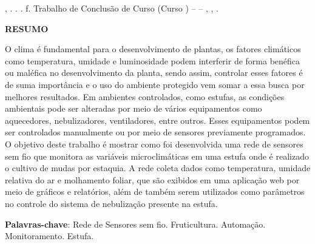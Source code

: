 %
%
\begin{RESUMO}

\thispagestyle{empty}
    \begin{SingleSpace}
	\noindent
		{\expandafter\uppercase\expandafter{\imprimirsobrenomeautor}}, {\imprimirnomeautor}. \textbf{{\imprimirtitulotb}}. {\imprimirdata}. \pageref{LastPage}f. Trabalho de Conclusão de Curso (Curso {\imprimirprograma}) – {\imprimirinstituicao} – {\imprimirdepartamento}, {\imprimirlocal}, {\imprimirdata}.
		
	\end{SingleSpace}
    
    \vspace{1cm}
    
    \begin{center}
	    \textbf{RESUMO}
    \end{center}
    
	\begin{SingleSpace}
	\hspace{-1.2 cm}O clima é fundamental para o desenvolvimento de plantas, os fatores climáticos como  temperatura, umidade e luminosidade podem interferir de forma benéfica ou maléfica no desenvolvimento da planta, sendo assim, controlar esses fatores é de suma importância e o uso do ambiente protegido vem somar a essa busca por melhores resultados. Em ambientes controlados, como estufas, as condições ambientais pode ser alteradas por meio de vários equipamentos como aquecedores, nebulizadores, ventiladores, entre outros. Esses equipamentos podem ser controlados manualmente ou por meio de sensores previamente programados. 
	O objetivo deste trabalho é mostrar como foi desenvolvida uma rede de sensores sem fio que monitora as variáveis microclimáticas em uma estufa onde é realizado o cultivo de mudas por estaquia. A rede coleta dados como temperatura, umidade relativa do ar e molhamento foliar, que são exibidos em uma aplicação web por meio de gráficos e relatórios, além de também serem utilizados como parâmetros no controle do sistema de nebulização presente na estufa. 
	
	\vspace*{0.5cm}\hspace{-1.3 cm}\textbf{Palavras-chave}: Rede de Sensores sem fio. Fruticultura. Automação. Monitoramento. Estufa.
		
	\end{SingleSpace}
\end{RESUMO}


